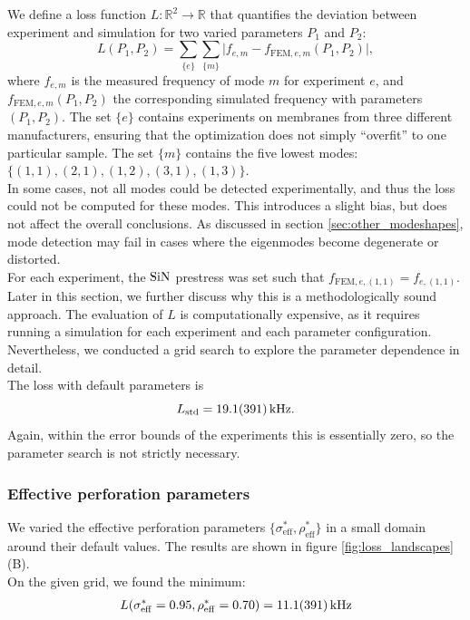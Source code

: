 We define a loss function $L:\mathbb{R}^2 \rightarrow \mathbb{R}$ that quantifies the deviation between experiment and simulation for two varied parameters $P_1$ and $P_2$:
\[
L(P_1,P_2)=\sum\limits_{\{e\}} \sum\limits_{\{ m\}} \big| f_{e,m} - f_{\mathrm{FEM},e,m}(P_1,P_2) \big|,
\]
where $f_{e,m}$ is the measured frequency of mode $m$ for experiment $e$, and $f_{\mathrm{FEM},e,m}(P_1,P_2)$ the corresponding simulated frequency with parameters $(P_1,P_2)$. The set $\{e\}$ contains experiments on membranes from three different manufacturers, ensuring that the optimization does not simply “overfit” to one particular sample. The set $\{ m\}$ contains the five lowest modes: $\{(1,1),(2,1),(1,2),(3,1),(1,3)\}$.\\

In some cases, not all modes could be detected experimentally, and thus the loss could not be computed for these modes. This introduces a slight bias, but does not affect the overall conclusions. As discussed in section \ref{sec:other_modeshapes}, mode detection may fail in cases where the eigenmodes become degenerate or distorted.\\

For each experiment, the $\mathrm{SiN}$ prestress was set such that $f_{\mathrm{FEM},e,(1,1)}=f_{e,(1,1)}$. Later in this section, we further discuss why this is a methodologically sound approach. The evaluation of $L$ is computationally expensive, as it requires running a simulation for each experiment and each parameter configuration. Nevertheless, we conducted a grid search to explore the parameter dependence in detail.\\

The loss with default parameters is
\[
L_\mathrm{std}=\SI{19.1 \pm 39.1}{\kilo\hertz}.
\]
Again, within the error bounds of the experiments this is essentially zero, so the parameter search is not strictly necessary.\\

\subsubsection{Effective perforation parameters}
\label{sec:para_search_eff_perf}

We varied the effective perforation parameters $\{\sigma_{\mathrm{eff}}^*,\rho_{\mathrm{eff}}^*\}$ in a small domain around their default values. The results are shown in figure \ref{fig:loss_landscapes} (B).\\

On the given grid, we found the minimum:
\begin{align*}
    L(\sigma_\mathrm{eff}^*=0.95, \rho_\mathrm{eff}^*=0.70)&=\SI{11.1\pm39.1}{\kilo\hertz}\\
\end{align*}

